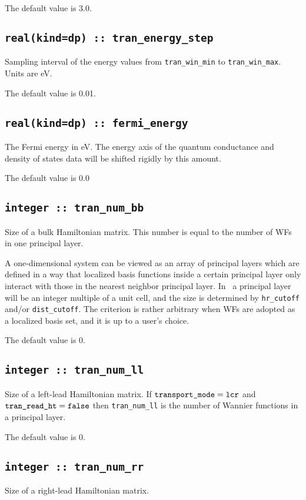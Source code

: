 The default value is 3.0.

\subsection[tran\_energy\_step]{\tt real(kind=dp) :: tran\_energy\_step}
Sampling interval of the energy values from \verb#tran_win_min#
to \verb#tran_win_max#.
Units are eV.

The default value is 0.01.

\subsection[fermi\_energy]{\tt real(kind=dp) :: fermi\_energy}
The Fermi energy in eV. The energy axis of the quantum conductance and
density of states data will be shifted rigidly by this amount.

The default value is 0.0

\subsection[tran\_num\_bb]{\tt integer :: tran\_num\_bb}
Size of a bulk Hamiltonian matrix.
This number is equal to the number of WFs in one principal
layer.

A one-dimensional system can be viewed
as an array of principal layers
which are defined in a way that
localized basis functions inside a certain principal layer
only interact with those in the nearest neighbor principal layer.
In \wannier\ a principal layer will be an integer multiple
of a unit cell, and the size is determined by
\verb#hr_cutoff# and/or \verb#dist_cutoff#.
The criterion is rather arbitrary
when WFs are adopted as a localized basis set,
and it is up to a user's choice.

The default value is 0.

\subsection[tran\_num\_ll]{\tt integer :: tran\_num\_ll}
Size of a left-lead Hamiltonian matrix.
If $\verb#transport_mode# = \verb#lcr#$ and
$\verb#tran_read_ht# = \verb#false#$ then
\verb#tran_num_ll# is the number of Wannier functions
in a principal layer.

The default value is 0.

\subsection[tran\_num\_rr]{\tt integer :: tran\_num\_rr}
Size of a right-lead Hamiltonian matrix.

